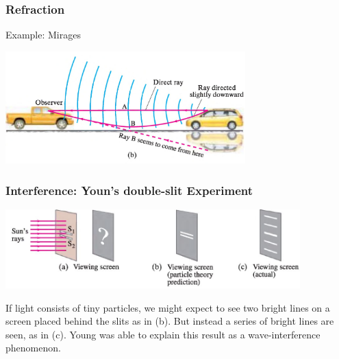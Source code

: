 \documentclass[]{beamer}
\begin{document}


\begin{frame}

\frametitle{Refraction}


Example: Mirages

\vspace{3mm}

  \begin{center}
  \includegraphics[height=1.7in]{images5/mirages.jpg}
\end{center}


  \end{frame}





\begin{frame}

\frametitle{Interference: Youn's double-slit Experiment}



\vspace{3mm}

  \begin{center}
  \includegraphics[height=1.2in]{images5/doubleslit.jpg}
\end{center}

\vspace{3mm}

If light consists of tiny particles, we might expect to see two bright lines on a screen placed behind
the slits as in (b). But instead a series of bright lines are seen, as in (c). Young was
able to explain this result as a wave-interference phenomenon.
  \end{frame}
\end{document}

